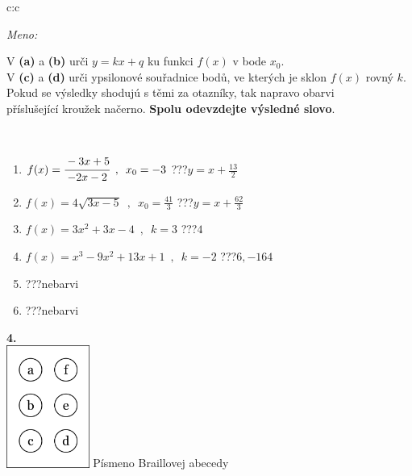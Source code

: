 \documentclass[10pt]{report}
\begin{document}
\begin{tabular}{c:c}
\begin{minipage}[c][104.5mm][t]{0.5\linewidth}
\begin{center}
\textit{Meno:}\phantom{xxxxxxxxxxxxxxxxxxxxxxxxxxxxxxxxxxxxxxxxxxxxxxxxxxxxxxxxxxxxxxxxx}\\[5mm]
\begin{minipage}{0.95\linewidth}
\begin{center}
V \textbf{(a)} a \textbf{(b)} urči  $y = kx + q$ ku funkci $f(x)$ v bode $x_0$.\\V \textbf{(c)} a \textbf{(d)} urči ypsilonové souřadnice bodů, ve kterých je sklon $f(x)$ rovný $k$.\\Pokud se výsledky shodujú s těmi za otazníky, tak napravo obarvi\\příslušející kroužek načerno. \textbf{Spolu odevzdejte výsledné slovo}.
\end{center}
\end{minipage}
\\[1mm]
\begin{minipage}{0.79\linewidth}
\begin{center}
\begin{varwidth}{\linewidth}
\begin{enumerate}
\small
\item $f(x)=\cfrac{-3x+5}{-2x-2}\enspace , \enspace x_0=-3$\quad \dotfill\; ???\;\dotfill \quad $y = x+\frac{13}{2}$
\item $f(x)=4\sqrt{3x-5}\enspace , \enspace x_0=\frac{41}{3}$\quad \dotfill\; ???\;\dotfill \quad $y = x+\frac{62}{3}$
\item $f(x)=3x^2+3x-4\enspace , \enspace k=3$\quad \dotfill\; ???\;\dotfill \quad $4$
\item $f(x)=x^3-9x^2+13x+1\enspace , \enspace k=-2$\quad \dotfill\; ???\;\dotfill \quad $6 , -164$
\item \quad \dotfill\; ???\;\dotfill \quad nebarvi
\item \quad \dotfill\; ???\;\dotfill \quad nebarvi
\end{enumerate}
\end{varwidth}
\end{center}
\end{minipage}
\begin{minipage}{0.20\linewidth}
\begin{center}
{\Huge\bfseries 4.} \\[2mm]
\includegraphics[height=40mm]{../images/braille.png}
{\small Písmeno Braillovej abecedy}
\end{center}
\end{minipage}
\end{center}
\end{minipage}
%
\end{tabular}
\end{document}
